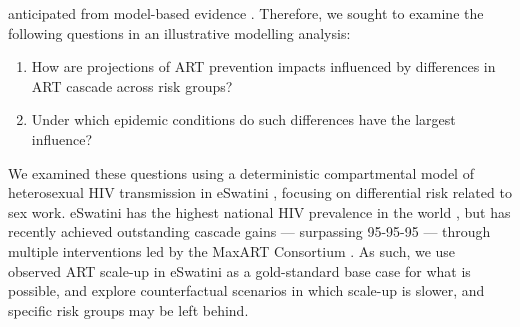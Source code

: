 anticipated from model-based evidence \cite{Baral2019}.
Therefore, we sought to examine the following questions
in an illustrative modelling analysis:
\begin{enumerate}
  \item\label{obj:1} How are projections of ART prevention impacts influenced by
    differences in ART cascade across risk groups?
  \item\label{obj:2} Under which epidemic conditions do such differences have the largest influence?
\end{enumerate}
We examined these questions using
a deterministic compartmental model of heterosexual HIV transmission in eSwatini \cite{Knight2019},
focusing on differential risk related to sex work.
eSwatini has the highest national HIV prevalence in the world \cite{UNAIDS2021},
but has recently achieved outstanding cascade gains --- surpassing 95-95-95 ---
through multiple interventions led by the MaxART Consortium \cite{Walsh2020,AIDSinfo}.
As such, we use observed ART scale-up in eSwatini as a gold-standard base case for what is possible,
and explore counterfactual scenarios in which scale-up is slower,
and specific risk groups may be left behind.
